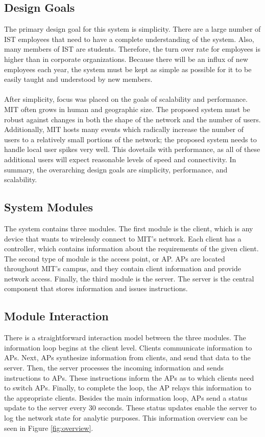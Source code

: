 \documentclass[10pt,journal,compsoc]{IEEEtran}
\begin{document}
        \subsection{Design Goals}
        
        The primary design goal for this system is simplicity. There are a large number of IST employees that need to have a complete understanding of the system. Also, many members of IST are students. Therefore, the turn over rate for employees is higher than in corporate organizations. Because there will be an influx of new employees each year, the system must be kept as simple as possible for it to be easily taught and understood by new members.\\
        \\
        After simplicity, focus was placed on the goals of scalability and performance. MIT often grows in human and geographic size. The proposed system must be robust against changes in both the shape of the network and the number of users. Additionally, MIT hosts many events which radically increase the number of users to a relatively small portions of the network; the proposed system needs to handle local user spikes very well. This dovetails with performance, as all of these additional users will expect reasonable levels of speed and connectivity. In summary, the overarching design goals are simplicity, performance, and scalability. \\
		\subsection{System Modules}
		The system contains three modules. The first module is the client, which is any device that wants to wirelessly connect to MIT's network. Each client has a controller, which contains information about the requirements of the given client. The second type of module is the access point, or AP. APs are located throughout MIT's campus, and they contain client information and provide network access. Finally, the third module is the server. The server is the central component that stores information and issues instructions.
		
		\subsection{Module Interaction}
		There is a straightforward interaction model between the three modules. The information loop begins at the client level. Clients communicate information to APs. Next, APs synthesize information from clients, and send that data to the server. Then, the server processes the incoming information and sends instructions to APs. These instructions inform the APs as to which clients need to switch APs. Finally, to complete the loop, the AP relays this information to the appropriate clients. Besides the main information loop, APs send a status update to the server every 30 seconds. These status updates enable the server to log the network state for analytic purposes. This information overview can be seen in Figure \ref{fig:overview}. 
		
\end{document}
